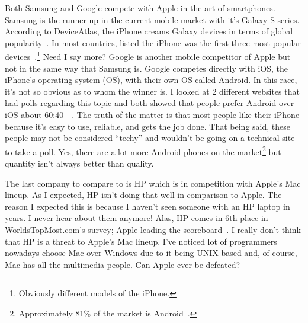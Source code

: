 \documentclass[12pt,a4paper,titlepage]{article}
\begin{document}
Both Samsung and Google compete with Apple in the art of smartphones. Samsung is
the runner up in the current mobile market with it's Galaxy S series. According
to DeviceAtlas, the iPhone creams Galaxy devices in terms of global
popularity~\cite{smartphones}. In most countries, listed the iPhone was
the first three most popular devices~\cite{smartphones}.\footnote{Obviously
  different models of the iPhone.} Need I say more? Google is another mobile
competitor of Apple but not in the same way that Samsung is. Google competes
directly with iOS, the iPhone's operating system (OS), with their own OS called
Android. In this race, it's not so obvious as to whom the winner is. I looked at
2 different websites that had polls regarding this topic and both showed that
people prefer Android over iOS about 60:40~\cite{poll1}~\cite{poll2}. The truth
of the matter is that most people like their iPhone because it's easy to use,
reliable, and gets the job done. That being said, these people may not be
considered ``techy'' and wouldn't be going on a technical site to take a
poll. Yes, there are a lot more Android phones on the
market\footnote{Approximately 81\% of the market is Android~\cite{verge}.} but
quantity isn't always better than quality.

The last company to compare to is HP which is in competition with Apple's Mac
lineup. As I expected, HP isn't doing that well in comparison to Apple. The
reason I expected this is because I haven't seen someone with an HP laptop in
years. I never hear about them anymore! Alas, HP comes in 6th place in
WorldsTopMost.com's survey; Apple leading the scoreboard~\cite{most}. I really
don't think that HP is a threat to Apple's Mac lineup. I've noticed lot of
programmers nowadays choose Mac over Windows due to it being UNIX-based and, of
course, Mac has all the multimedia people. Can Apple ever be defeated?

\newpage
\end{document}

